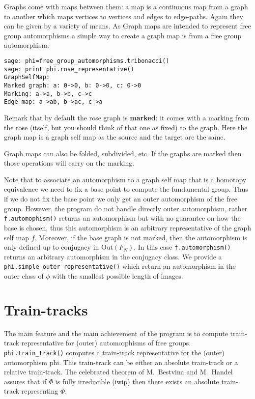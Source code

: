 \documentclass[10pt,a4paper]{article}
\newcommand{\Out}{\text{Out}}
\newcommand{\FN}{F_N}
\begin{document}
Graphs come with maps between them: a map is a continuous map from a
graph to another which maps vertices to vertices and edges to
edge-paths. Again they can be given by a variety of means. As Graph
maps are intended to represent free group automorphisms a simple way
to create a graph map is from a free group automorphism:
\begin{verbatim}
sage: phi=free_group_automorphisms.tribonacci()
sage: print phi.rose_representative()
GraphSelfMap:
Marked graph: a: 0->0, b: 0->0, c: 0->0
Marking: a->a, b->b, c->c
Edge map: a->ab, b->ac, c->a
\end{verbatim}
Remark that by default the rose graph is \textbf{marked}: it comes
with a marking from the rose (itself, but you should think of that one
as fixed) to the graph. Here the graph map is a graph self map as the
source and the target are the same.

Graph maps can also be folded, subdivided, etc. If the graphs are
marked then those operations will carry on the marking.

Note that to associate an automorphism to a graph self map that is a
homotopy equivalence we need to fix a base point to
compute the fundamental group. Thus if we do not fix the base point we
only get an outer automorphism of the free
group. However, the program do not handle directly outer automorphism,
rather \texttt{f.automophism()} returns an automorphism but with no
guarantee on how the base is chosen, thus this automorphism is an
arbitrary representative of the graph self map $f$.
Moreover, if the base graph is not marked, then the automorphism is
only defined up to conjugacy in $\Out(\FN)$.
In this case \texttt{f.automorphism()} returns an arbitrary
automorphism in the conjugacy class. We provide a
\texttt{phi.simple\_outer\_representative()} which return an
automorphism in the outer class of $\phi$ with the smallest possible length of images. 




\section{Train-tracks}

The main feature and the main achievement of the program is to compute
train-track representative for (outer) automorphisms of free groups.
\texttt{phi.train\_track()} computes a train-track representative for
the (outer) automorphism phi. This train-track can be either an
absolute train-track or a relative train-track. The celebrated theorem
of M.~Bestvina and M.~Handel~\cite{bh-traintrack} assures that if $\Phi$ is
fully irreducible (iwip) then there exists an absolute train-track
representing $\Phi$.
\end{document}

